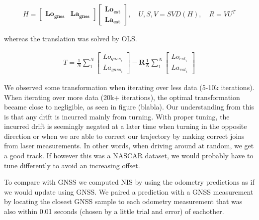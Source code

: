\begin{align*}
    H = 
    \begin{bmatrix}
        \mathbf{Lo_{gnss}} & \mathbf{La_{gnss}}
    \end{bmatrix}
    \begin{bmatrix}
        \mathbf{Lo_{est}} \\ \mathbf{La_{est}}
    \end{bmatrix}
    , \quad
    U, S, V = SVD(H)
    , \quad
    R = VU^T
\end{align*}

whereas the translation was 
solved by OLS.

\begin{align*}
    T = \frac{1}{N} \sum_{1}^{N} 
    \begin{bmatrix}
        Lo_{gnss_i} \\ La_{gnss_i}
    \end{bmatrix}
    - \mathbf{R}
    \frac{1}{N} \sum_{1}^{N} 
    \begin{bmatrix}
        Lo_{est_i} \\ La_{est_i}
    \end{bmatrix}
\end{align*}

We observed some transformation when iterating over less data
(5-10k iterations). When iterating over more data (20k+ iterations),
the optimal transformation became close to negligible, as seen in figure (blabla).
Our understanding from this is that any drift is incurred mainly
from turning. With proper tuning, the incurred drift is seemingly negated
at a later time when turning in the opposite direction or when we are able
to correct our trajectory by making correct joins from laser measurements.
In other words,
when driving around at random, we get a good track. If however this 
was a NASCAR dataset, we would probably have to tune differently to 
avoid an increasing offset.

To compare with GNSS we computed NIS by using the odometry predictions
as if we would update using GNSS. We paired a prediction with a GNSS
measurement by locating the closest GNSS sample to each odometry measurement
that was also within 0.01 seconds (chosen by a little trial and error) 
of eachother.